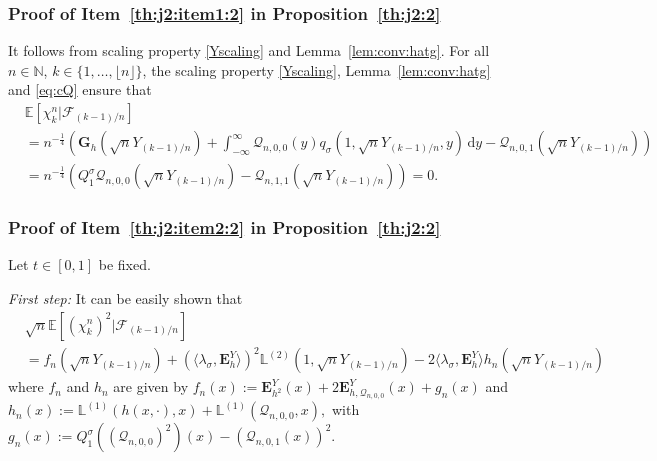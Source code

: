 \documentclass[12pt]{article}
\numberwithin{equation}{section}
\theoremstyle{definition}
\theoremstyle{remark}
\newcommand{\NN}{\mathbb{N}}
\newcommand{\EE}{\mathbb{E}}
\newcommand{\cQ}{\mathcal{Q}}
\newcommand{\cF}{\mathcal{F}}
\newcommand{\vd}{\,\mathrm{d}}
\newcommand{\bfH}[1]{\mathbf{E}^Y_{#1}}
\newcommand{\bfG}[1]{\mathbf{G}_{#1}}
\newcommand{\Lm}[3]{\mathbb{L}^{(#2)}(#1,#3)}
\begin{document}
\subsubsection{Proof of 
Item~\ref{th:j2:item1:2} in Proposition~\ref{th:j2:2} 
} 
It follows from scaling property \eqref{Yscaling} and Lemma~\ref{lem:conv:hatg}.
For all $n\in \NN$, $k\in \{1, \ldots, \lfloor n \rfloor \}$, the scaling property \eqref{Yscaling}, Lemma~\ref{lem:conv:hatg} and \eqref{eq:cQ} ensure that 
\begin{equation} \begin{split}
	& \EE\!\left[ \chi_k^n | \cF_{(k-1)/n}\right] 
	\\
	& = n^{-\frac14} \left( \bfG{h}(\sqrt{n} Y_{(k-1)/n}) + \int_{-\infty}^\infty \cQ_{n,0,0}(y) q_\sigma(1, \sqrt{n} Y_{(k-1)/n}, y) \vd y - \cQ_{n,0,1}(\sqrt{n} Y_{(k-1)/n})\right)
	\\
	& = n^{-\frac14} \left(Q^\sigma_1 \cQ_{n,0,0}(\sqrt{n} Y_{(k-1)/n}) - \cQ_{n,1,1}(\sqrt{n} Y_{(k-1)/n})\right)=0.
\end{split}
\end{equation}







\subsubsection{Proof of Item~\ref{th:j2:item2:2} in Proposition~\ref{th:j2:2}}
Let $t\in [0,1]$ be fixed.

{\it First step:}
It can be easily shown that
\begin{equation}
\begin{split}
	& \sqrt n \EE\!\left[ (\chi_k^n)^2 | \cF_{(k-1)/n}\right] 
	\\
	& =   f_{n}(\sqrt{n} Y_{(k-1)/n}) + (\langle \lambda_\sigma , \bfH h \rangle)^2 \Lm{1}{2}{\sqrt{n} Y_{(k-1)/n}}  - 2 \langle \lambda_\sigma , \bfH h \rangle  h_n(\sqrt{n} Y_{(k-1)/n})
\end{split}
\end{equation}
where $f_n$ and $h_n$ are given by 
$
f_n(x) := \bfH {h^2}(x)  
 	+ 2 \bfH{h, \cQ_{n,0,0}} (x) + g_n(x)
$ 
and
$
h_n(x):= %
	\Lm{h(x, \cdot)}{1}{x} + \Lm{\cQ_{n,0,0}}{1}{x},
$
with  
$ 
g_n(x):=Q^\sigma_1\left(  ( \cQ_{n,0,0} )^2 \right) (x)    - \left(\cQ_{n,0,1}(x)\right)^2
$.
\end{document}
